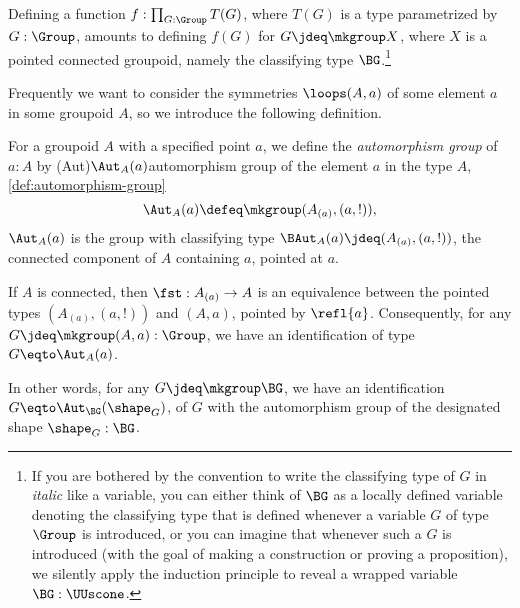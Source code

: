\begin{remark}\label{rem:BG-convention}
  Defining a function $f : \prod_{G:\Group}T(G)$,
  where $T(G)$ is a type parametrized by $G:\Group$,
  amounts to defining $f(G)$ for $G\jdeq\mkgroup X$,
  where $X$ is a pointed connected groupoid,
  namely the classifying type $\BG$.\footnote{%
    If you are bothered by the convention
    to write the classifying type of $G$ in \emph{italic} like a variable,
    you can either think of $\BG$ as a locally defined
    variable denoting the classifying type that is
    defined whenever a variable $G$ of type $\Group$ is introduced,
    or you can imagine that whenever such a $G$ is introduced
    (with the goal of making a construction or proving a proposition),
    we silently apply the induction principle to
    reveal a wrapped variable $\BG:\UUscone$.}
\end{remark}

Frequently we want to consider the symmetries $\loops(A,a)$ of some element $a$ in some groupoid $A$, so we introduce the following definition.

\begin{definition}\label{def:automorphism-group}
  For a groupoid $A$ with a specified point $a$,
  we define the \emph{automorphism group} of $a:A$ by%
  \glossary(Aut){$\protect\Aut_A(a)$}{automorphism group of the element $a$
    in the type $A$, \cref{def:automorphism-group}}%
  \[
    \Aut_A(a) \defeq \mkgroup (A_{(a)},(a,!)),
  \]
  \ie $\Aut_A(a)$ is the group with classifying type
  $\BAut_A(a) \jdeq (A_{(a)},(a,!))$,
  the connected component of $A$ containing $a$, pointed at $a$.
\end{definition}
\begin{remark}
  \label{rem:symmetriesofnonconnectedgroupoids}
  If $A$ is connected, then $\fst: A_{(a)} \to A$ is an equivalence 
  between the pointed types $(A_{(a)},(a,!))$ and $(A,a)$, pointed by $\refl{a}$.
  Consequently, for any $G \jdeq \mkgroup(A,a) : \Group$, 
  we have an identification of type $G \eqto \Aut_A(a)$.

  In other words, for any $G \jdeq \mkgroup\BG$, we have
  an identification $G \eqto \Aut_{\BG}(\shape_G)$, of $G$ with the automorphism
  group of the designated shape $\shape_G : \BG$.
\end{remark}

